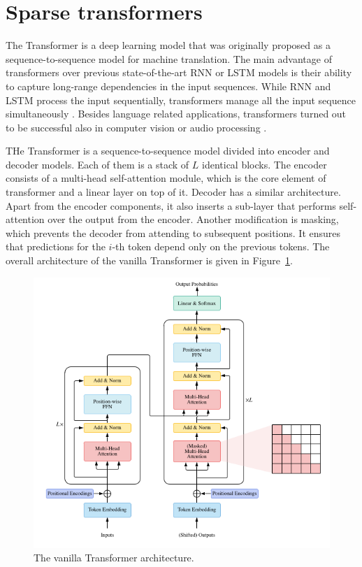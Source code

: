 \documentclass[en]{pracamgr}
\begin{document}
\section{Sparse transformers}
The Transformer \cite{DBLP:conf/nips/VaswaniSPUJGKP17} is a deep learning model that was originally proposed as a sequence-to-sequence model \cite{DBLP:conf/nips/SutskeverVL14} for machine translation. The main advantage of transformers over previous state-of-the-art RNN or LSTM models is their ability to capture long-range dependencies in the input sequences. While RNN and LSTM process the input sequentially, transformers manage all the input sequence simultaneously \cite{DBLP:journals/corr/abs-2306-07303}.
Besides language related applications, transformers turned out to be successful also in computer vision \cite{DBLP:conf/iclr/DosovitskiyB0WZ21} or audio processing \cite{DBLP:journals/corr/abs-2106-04554}.

THe Transformer is a sequence-to-sequence model divided into encoder and decoder models. Each of them is a stack of $L$ identical blocks. The encoder consists of a multi-head self-attention module, which is the core element of transformer and a linear layer on top of it. Decoder has a similar architecture. Apart from the encoder components, it also inserts a sub-layer that performs self-attention over the output from the encoder. Another modification is masking, which prevents the decoder from attending to subsequent positions. It ensures that predictions for the $i$-th token depend only on the previous tokens. The overall architecture of the vanilla Transformer is given in Figure~\ref{attention}.

\begin{figure}[H]
\centering
\includegraphics[scale=0.5]{images/attention.png}
\caption{The vanilla Transformer architecture.}
\label{attention}
\end{figure}
\end{document}
